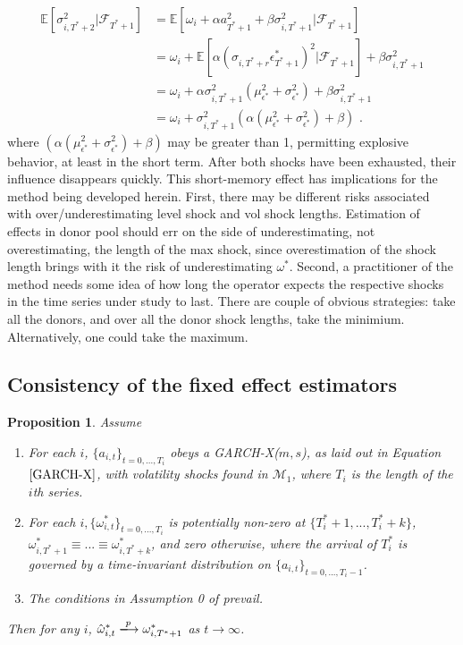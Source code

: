 \documentclass[11pt,3p,review,authoryear]{elsarticle}
\def\mc#1{\mathcal{#1}} %
\def\mc#1{\mathcal{#1}}
\newtheorem{prop}{Proposition}
\theoremstyle{definition}
\begin{document}
\begin{align*}
\mathbb{E}[ \sigma^{2}_{i,T^{*}+2} |\mathcal{F}_{T^{*}+1}] & = \mathbb{E}[\omega_{i} + \alpha a_{T^{*}+1}^{2} + \beta\sigma^{2}_{i,T^{*}+1} |\mathcal{F}_{T^{*}+1}] \\
& = \omega_{i} + \mathbb{E}[\alpha(\sigma_{i,T^{*}+r}\epsilon^{*}_{T^{*}+1})^{2} |\mathcal{F}_{T^{*}+1}] + \beta\sigma^{2}_{i,T^{*}+1} \\
& = \omega_{i} + \alpha\sigma^{2}_{i,T^{*}+1}(\mu^{2}_{\epsilon^{*}} + \sigma^{2}_{\epsilon^{*}}) + \beta\sigma^{2}_{i,T^{*}+1} \\
& = \omega_{i} + \sigma^{2}_{i,T^{*}+1}(\alpha(\mu^{2}_{\epsilon^{*}} + \sigma^{2}_{\epsilon^{*}}) + \beta)\text{ .}
\end{align*}
where $(\alpha(\mu^{2}_{\epsilon^{*}} + \sigma^{2}_{\epsilon^{*}}) + \beta)$ may be greater than 1, permitting explosive behavior, at least in the short term.  After both shocks have been exhausted, their influence disappears quickly.  This short-memory effect has implications for the method being developed herein.  First, there may be different risks associated with over/underestimating level shock and vol shock lengths.  Estimation of effects in donor pool should err on the side of underestimating, not overestimating, the length of the max shock, since overestimation of the shock length brings with it the risk of underestimating $\omega^{*}$.  Second, a practitioner of the method needs some idea of how long the operator expects the respective shocks in the time series under study to last.  There are couple of obvious strategies: take all the donors, and over all the donor shock lengths, take the minimium.  Alternatively, one could take the maximum.

\subsection{Consistency of the fixed effect estimators}

\begin{prop}\label{omega_consistency}
Assume
\begin{enumerate}
  \item For each $i$, $\{a_{i,t}\}_{t=0,...,T_i}$ obeys a GARCH-X($m,s$), as laid out in Equation $\eqref{GARCH-X}$, with volatility shocks found in $\mc{M}_{1}$, where $T_i$ is the length of the $i$th series.
  \item For each $i, \{\omega_{i,t}^{*}\}_{t=0,...,T_i}$ is potentially non-zero at $\{T^{*}_{i}+1,... ,T^{*}_{i}+k\}$, $\omega_{i,T^{*}+1}^{*}\equiv...\equiv\omega_{i,T^{*}+k}^{*}$, and zero otherwise, where the arrival of $T_{i}^{*}$ is governed by a time-invariant distribution on $\{a_{i,t}\}_{t=0,...,T_i-1}$. \label{stationarity_of_omega_i_t}
  \item The conditions in Assumption 0 of \citet{han2014asymptotic} prevail.
\end{enumerate}
Then for any $i$, $\hat\omega_{i,t}^{*} \xlongrightarrow{p} \omega_{i,T^{*}+1}^{*}$ as $t\rightarrow\infty$.
\end{prop}
\end{document}
